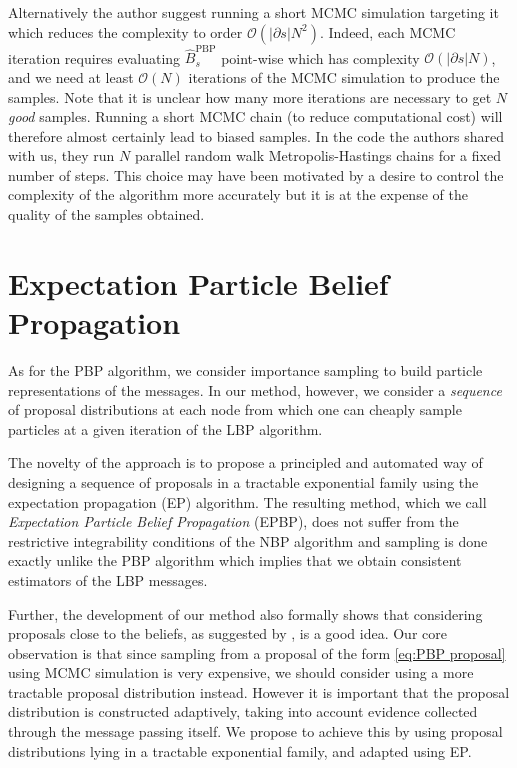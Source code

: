Alternatively the author suggest running a short MCMC simulation targeting it which reduces the complexity to order $\mathcal O {(|\partial {s}|N^{2})}$. Indeed, each MCMC iteration requires evaluating $\widehat B_{s}^{\text{PBP}}$ point-wise which has complexity $\mathcal O {(|\partial{s}|N)}$, and we need at least $\mathcal{O}(N)$ iterations of the MCMC simulation to produce the samples. Note that it is unclear how many more iterations are necessary to get $N$ \emph{good} samples. Running a short MCMC chain (to reduce computational cost) will therefore almost certainly lead to biased samples. In the code the authors shared with us, they run $N$ parallel random walk Metropolis-Hastings chains \citep[chapter 6]{robert04} for a fixed number of steps. This choice may have been motivated by a desire to control the complexity of the algorithm more accurately but it is at the expense of the quality of the samples obtained.

\section{Expectation Particle Belief Propagation}
As for the PBP algorithm, we consider importance sampling to build particle representations of the messages. In our method, however, we consider a \emph{sequence} of proposal distributions at each node from which one can cheaply sample particles at a given iteration of the LBP algorithm. 

The novelty of the approach is to propose a principled and automated way of designing a sequence of proposals in a tractable exponential family using the expectation propagation (EP) algorithm. The resulting method, which we call \emph{Expectation Particle Belief Propagation} (EPBP), does not suffer from the restrictive integrability conditions of the NBP algorithm and sampling is done exactly unlike the PBP algorithm which implies that we obtain consistent estimators of the LBP messages.

Further, the development of our method also formally shows that considering proposals close to the beliefs, as suggested by \cite{ihler09}, is a good idea.  Our core observation is that since sampling from a proposal of the form \eqref{eq:PBP proposal} using MCMC simulation is very expensive, we should consider using a more tractable proposal distribution instead. However it is important that the proposal distribution is constructed adaptively, taking into account evidence collected through the message passing itself. We propose to achieve this by using proposal distributions lying in a tractable exponential family, and adapted using EP.

